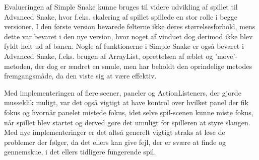Evalueringen af Simple Snake kunne bruges til videre udvikling af spillet til Advanced Snake, hvor f.eks. skalering af spillet spillede en stor rolle i begge versioner. I den første version bevarede felterne ikke deres størrelsesforhold, mens dette var bevaret i den nye version, hvor noget af vinduet dog derimod ikke blev fyldt helt ud af banen. Nogle af funktionerne i Simple Snake er også bevaret i Advanced Snake, f.eks. brugen af ArrayList, oprettelsen af æblet og 'move'-metoden, der dog er ændret en smule, men har beholdt den oprindelige metodes fremgangsmåde, da den viste sig at være effektiv.

Med implementeringen af flere scener, paneler og ActionListeners, der gjorde musseklik muligt, var det også vigtigt at have kontrol over hvilket panel der fik fokus og hvornår panelet mistede fokus, idet selve spil-scenen kunne miste fokus, når spillet blev startet og derved gøre det umuligt for spilleren at styre slangen. Med nye implementeringer er det altså generelt vigtigt straks at løse de problemer der følger, da det ellers kan give fejl, der er svære at finde og gennemskue, i det ellers tidligere fungerende spil.
